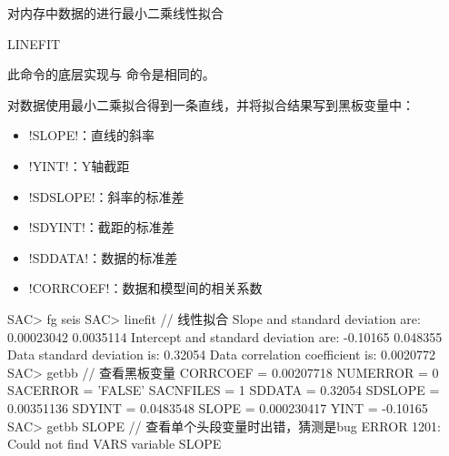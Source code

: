 \label{cmd:linefit}

对内存中数据的进行最小二乘线性拟合

\begin{SACSTX}
LINEFIT
\end{SACSTX}

此命令的底层实现与  命令是相同的。

对数据使用最小二乘拟合得到一条直线，并将拟合结果写到黑板变量中：
\begin{itemize}
\item !SLOPE!：直线的斜率
\item !YINT!：Y轴截距
\item !SDSLOPE!：斜率的标准差
\item !SDYINT!：截距的标准差
\item !SDDATA!：数据的标准差
\item !CORRCOEF!：数据和模型间的相关系数
\end{itemize}

\begin{SACCode}
SAC> fg seis
SAC> linefit            // 线性拟合
 Slope and standard deviation are: 0.00023042 0.0035114
 Intercept and standard deviation are: -0.10165 0.048355
 Data standard deviation is: 0.32054
 Data correlation coefficient is: 0.0020772
SAC> getbb             // 查看黑板变量
 CORRCOEF     = 0.00207718
 NUMERROR = 0
 SACERROR = 'FALSE'
 SACNFILES = 1
 SDDATA     = 0.32054
 SDSLOPE     = 0.00351136
 SDYINT     = 0.0483548
 SLOPE     = 0.000230417
 YINT     = -0.10165
SAC> getbb SLOPE       // 查看单个头段变量时出错，猜测是bug
 ERROR 1201: Could not find VARS variable SLOPE
\end{SACCode}
